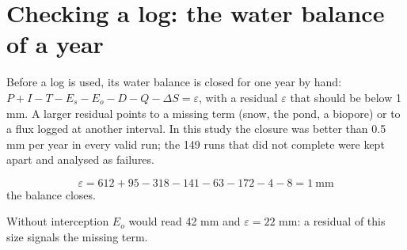\section{Checking a log: the water balance of a year}\label{sec:at-check}
Before a log is used, its water balance is closed for one year by hand: $P+I-T-E_s-E_o-D-Q-\Delta S=\varepsilon$, with a residual $\varepsilon$ that should be below 1 mm. A larger residual points to a missing term (snow, the pond, a biopore) or to a flux logged at another interval. In this study the closure was better than 0.5 mm per year in every valid run; the 149 runs that did not complete were kept apart and analysed as failures.

\sol
\par\noindent \[\varepsilon=612+95-318-141-63-172-4-8=1\ \text{mm}\]
the balance closes.\finans
\par\noindent Without interception $E_o$ would read 42 mm and $\varepsilon=22$ mm: a residual of this size signals the missing term.\finans
